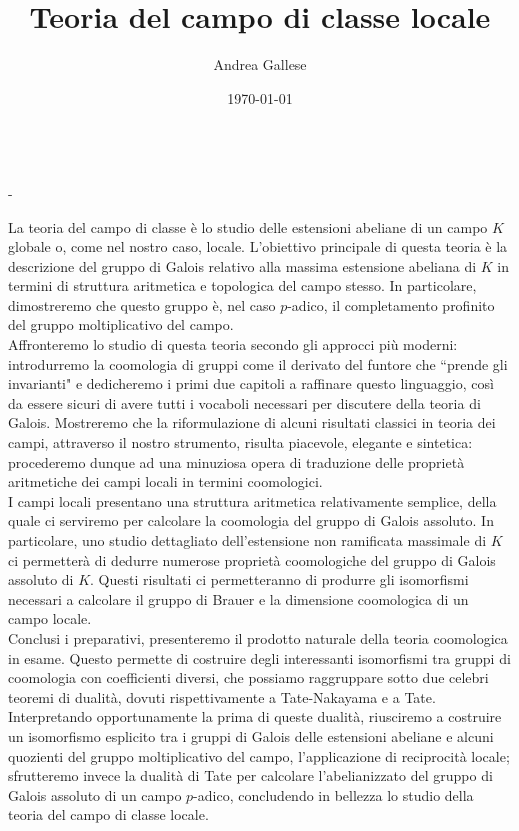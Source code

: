 \documentclass[a4paper]{article}
\title{Teoria del campo di classe locale}\let\Title\@title
\author{Andrea Gallese}\let\Author\@author
\date{\today}\let\Date\@date
\newcommand{\Intitola}{\begin{center}
		\vspace*{0,5 cm}
		{\huge \textsc{\Title}} \\
		\vspace{0,5 cm}
		\texttt{\Author} \hspace{0.5cm} - \hspace{0.5cm} \texttt{\Date}
		\thispagestyle{empty}
		\vspace{0,7 cm}
\end{center}}
\theoremstyle{remark}
\theoremstyle{definition}
\begin{document}
\Intitola

La teoria del campo di classe è lo studio delle estensioni abeliane di un campo $ K $ globale o, come nel nostro caso, locale. L'obiettivo principale di questa teoria è la descrizione del gruppo di Galois relativo alla massima estensione abeliana di $K$ in termini di struttura aritmetica e topologica del campo stesso. In particolare, dimostreremo che questo gruppo è, nel caso $p$-adico, il completamento profinito del gruppo moltiplicativo del campo. \\

Affronteremo lo studio di questa teoria secondo gli approcci più moderni: introdurremo la coomologia di gruppi come il derivato del funtore che \textquotedblleft prende gli invarianti" e dedicheremo i primi due capitoli a raffinare questo linguaggio, così da essere sicuri di avere tutti i vocaboli necessari per discutere della teoria di Galois. Mostreremo che la riformulazione di alcuni risultati classici in teoria dei campi, attraverso il nostro strumento, risulta piacevole, elegante e sintetica: procederemo dunque ad una minuziosa opera di traduzione delle proprietà aritmetiche dei campi locali in termini coomologici. \\

I campi locali presentano una struttura aritmetica relativamente semplice, della quale ci serviremo per calcolare la coomologia del gruppo di Galois assoluto. In particolare, uno studio dettagliato dell'estensione non ramificata massimale di $K$ ci permetterà di dedurre numerose proprietà coomologiche del gruppo di Galois assoluto di $K$. Questi risultati ci permetteranno di produrre gli isomorfismi necessari a calcolare il gruppo di Brauer e la dimensione coomologica di un campo locale. \\

Conclusi i preparativi, presenteremo il prodotto naturale della teoria coomologica in esame. Questo permette di costruire degli interessanti isomorfismi tra gruppi di coomologia con coefficienti diversi, che possiamo raggruppare sotto due celebri teoremi di dualità, dovuti rispettivamente a Tate-Nakayama e a Tate. Interpretando opportunamente la prima di queste dualità, riusciremo a costruire un isomorfismo esplicito tra i gruppi di Galois delle estensioni abeliane e alcuni quozienti del gruppo  moltiplicativo del campo, l'applicazione di reciprocità locale; sfrutteremo invece la dualità di Tate per calcolare l'abelianizzato del gruppo di Galois assoluto di un campo $ p $-adico, concludendo in bellezza lo studio della teoria del campo di classe locale. \\
\end{document}
